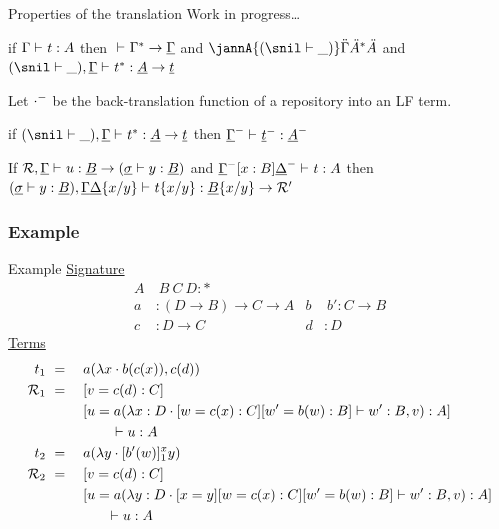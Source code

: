 \documentclass[ignorenonframetext,red]{beamer}
\begin{document}
\begin{frame}{Properties of the translation}
  Work in progress\ldots
  \begin{theorem}[Soundness]
    if $\jxlft\me\mo\mf$ then $\jannsi{\fflatten\me}\me$ and $\jannA{(\sapply\snil\_)}\me{\fflatten\mf}\mf$ and
    $\jannt{(\sapply\snil\_)}\me{\fflatten\mo}\mf\mo$
  \end{theorem}
  \begin{definition}[Checkout]
    Let $\fcheckout\cdot$ be the back-translation
    function of a repository into an LF term.
  \end{definition}
  \begin{theorem}[Completeness]
    if $\jannt{(\sapply\snil\_)}\me{\fflatten\mo}\mf\mo$ then $\jxlft{\fcheckout\me}{\fcheckout\mo}{\fcheckout\mf}$
  \end{theorem}
  \begin{theorem}[Substitution]
    If $\jannt\mr\me\mmo\mmf{(\sapply\ms{\mmv:\mmf})}$ and
    $\jxlft{\econs{\fcheckout\me}{x:\mmf}{\fcheckout\mme}}\mo\mf$ then
    $\jannt{(\sapply\ms{\mmv:\mmf})}{\me{\repl\mme\mv\mmv}}{\repl\mo\mv\mmv}{\repl\mmf\mv\mmv}\mmr$
  \end{theorem}
\end{frame}

\subsubsection{Example}

\begin{frame}{Example}
  \underline{Signature}
  \begin{align*}
    A&\ B\ C\ D : * \\
    a &: (D\to B)\to C\to A     & b&\ b' : C\to B \\
    c &: D\to C                 & d &: D
  \end{align*}
  \underline{Terms}
  \small
  \begin{align*}
    t_1\ &=\quad
    {a}({{\lambda{x}\cdot {b}({{c}({x})})},{{c}({d})}}) \\
    \mathcal{R}_1\ &=\quad
    [{v}={{c}({d}) : C}] \\
    &\ \qquad[{u}={{a}({{\lambda{x}:{D}\cdot
          [{w}={{c}({x}) : C}][{w'}={{b}({w}) : B}]\vdash w' :
          B},{v}}) : A}] \\
    &\ \qquad\qquad\vdash u : A\\
    t_2 \ &=\quad
    {a}({\lambda{y}\cdot {[{b'}({w})]_{1}^{x} y}}) \\
    \mathcal{R}_2\ &=\quad
    [{v}={{c}({d}) : C}] \\
    &\ \qquad[{u}={{a}({{\lambda{y}:{D}\cdot
          [{x}={y}] [{w}={{c}({x}) : C}] [{w'}={{b}({w}) : B}]\vdash w' :
          B},{v}}) : A}] \\
    &\qquad\qquad \vdash u : A
  \end{align*}
\end{frame}
\end{document}
